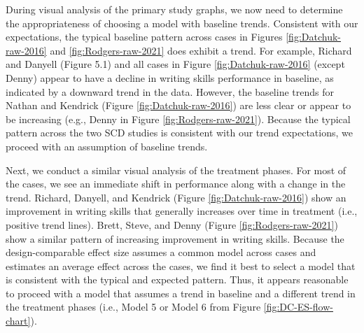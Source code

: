 \documentclass[
]{book}
\begin{document}
During visual analysis of the primary study graphs, we now need to determine the appropriateness of choosing a model with baseline trends. Consistent with our expectations, the typical baseline pattern across cases in Figures \ref{fig:Datchuk-raw-2016} and \ref{fig:Rodgers-raw-2021} does exhibit a trend. For example, Richard and Danyell (Figure 5.1) and all cases in Figure \ref{fig:Datchuk-raw-2016} (except Denny) appear to have a decline in writing skills performance in baseline, as indicated by a downward trend in the data. However, the baseline trends for Nathan and Kendrick (Figure \ref{fig:Datchuk-raw-2016}) are less clear or appear to be increasing (e.g., Denny in Figure \ref{fig:Rodgers-raw-2021}). Because the typical pattern across the two SCD studies is consistent with our trend expectations, we proceed with an assumption of baseline trends.

Next, we conduct a similar visual analysis of the treatment phases. For most of the cases, we see an immediate shift in performance along with a change in the trend. Richard, Danyell, and Kendrick (Figure \ref{fig:Datchuk-raw-2016}) show an improvement in writing skills that generally increases over time in treatment (i.e., positive trend lines). Brett, Steve, and Denny (Figure \ref{fig:Rodgers-raw-2021}) show a similar pattern of increasing improvement in writing skills. Because the design-comparable effect size assumes a common model across cases and estimates an average effect across the cases, we find it best to select a model that is consistent with the typical and expected pattern. Thus, it appears reasonable to proceed with a model that assumes a trend in baseline and a different trend in the treatment phases (i.e., Model 5 or Model 6 from Figure \ref{fig:DC-ES-flow-chart}).
\end{document}
